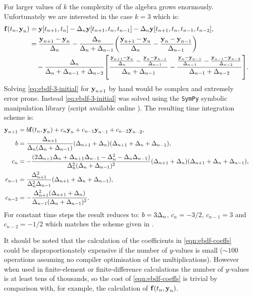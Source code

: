 For larger values of $k$ the complexity of the algebra grows enormously.
Unfortunately we are interested in the case $k=3$ which is:
\begin{equation}
  \begin{aligned}
    {\boldsymbol{\mathrm{f}}}(t_n, \boldsymbol{\mathrm{y}}_n) &= \boldsymbol{\mathrm{y}}[t_{n+1}, t_n] - \Delta_{n} \boldsymbol{\mathrm{y}}[t_{n+1}, t_n, t_{n-1}] -\Delta_{n} \boldsymbol{\mathrm{y}}[t_{n+1}, t_n, t_{n-1}, t_{n-2}], \\
    &=  \frac{\boldsymbol{\mathrm{y}}_{n+1} - \boldsymbol{\mathrm{y}}_n}{\Delta_{n}}
    - \frac{\Delta_{n}}{\Delta_{n} + \Delta_{n-1}} {\left(  \frac{\boldsymbol{\mathrm{y}}_{n+1} - \boldsymbol{\mathrm{y}}_n}{\Delta_{n}} - \frac{\boldsymbol{\mathrm{y}}_n - \boldsymbol{\mathrm{y}}_{n-1}}{\Delta_{n-1}} \right)} \\
    &\quad - \frac{\Delta_{n}}{\Delta_{n} + \Delta_{n-1} + \Delta_{n-2}}
         {\left[ 
           \frac{\frac{\boldsymbol{\mathrm{y}}_{n+1} - \boldsymbol{\mathrm{y}}_n}{\Delta_{n}} - \frac{\boldsymbol{\mathrm{y}}_n - \boldsymbol{\mathrm{y}}_{n-1}}{\Delta_{n-1}}}
                {\Delta_{n} +\Delta_{n-1}}
           -
           \frac{\frac{\boldsymbol{\mathrm{y}}_{n} - \boldsymbol{\mathrm{y}}_{n-1}}{\Delta_{n-1}} - \frac{\boldsymbol{\mathrm{y}}_{n-1} - \boldsymbol{\mathrm{y}}_{n-2}}{\Delta_{n-2}}}
                {\Delta_{n-1} +\Delta_{n-2}}
          \right]}.
  \end{aligned}
  \label{eq:ebdf-3-initial}
\end{equation}
Solving \cref{eq:ebdf-3-initial} for $\boldsymbol{\mathrm{y}}_{n+1}$ by hand would be complex and extremely error prone.
Instead \cref{eq:ebdf-3-initial} was solved using the \texttt{SymPy} symbolic manipulation library \cite{sympy} (script available online \cite{ebdf3-sympy-script}).
The resulting time integration scheme is:
\begin{equation}
  \label{eqn:ebdf-coeffs}
  \begin{aligned}
    \boldsymbol{\mathrm{y}}_{n+1} &= b {\boldsymbol{\mathrm{f}}}(t_n, \boldsymbol{\mathrm{y}}_n) + c_n \boldsymbol{\mathrm{y}}_n + c_{n-1} \boldsymbol{\mathrm{y}}_{n-1} + c_{n-2} \boldsymbol{\mathrm{y}}_{n-2}, \\
    b &= \frac{\Delta_{n+1}}{\Delta_{n} (\Delta_{n} + \Delta_{n-1})} (\Delta_{n+1} + \Delta_{n}) (\Delta_{n+1} + \Delta_{n} + \Delta_{n-1}) ,\\
    c_n &= - \frac{ (2 \Delta_{n+1} \Delta_{n} + \Delta_{n+1} \Delta_{n-1} - \Delta_{n}^{2} - \Delta_{n} \Delta_{n-1}) }{\Delta_{n}^{2} (\Delta_{n} + \Delta_{n-1})^{2}} (\Delta_{n+1} + \Delta_{n}) (\Delta_{n+1} + \Delta_{n} + \Delta_{n-1}),\\
    c_{n-1} &= \frac{\Delta_{n+1}^{2}}{\Delta_{n}^{2} \Delta_{n-1}} (\Delta_{n+1} + \Delta_{n} + \Delta_{n-1}) ,\\
    c_{n-2} &= - \frac{\Delta_{n+1}^{2} (\Delta_{n+1} + \Delta_{n})}{\Delta_{n-1} (\Delta_{n} + \Delta_{n-1})^{2}}.
  \end{aligned}
\end{equation}
For constant time steps the result reduces to: $ b = 3\Delta_{n}$, $c_n = -3/2$, $c_{n-1} = 3$ and  $c_{n-2} = -1/2$ which matches the scheme given in \cite[364]{HairerNorsettWanner}.

It should be noted that the calculation of the coefficients in \cref{eqn:ebdf-coeffs} could be disproportionately expensive if the number of $y$-values is small ($\sim 100$ operations assuming no compiler optimisation of the multiplications).
However when used in finite-element or finite-difference calculations the number of $y$-values is at least tens of thousands, so the cost of \cref{eqn:ebdf-coeffs} is trivial by comparison with, for example, the calculation of ${\boldsymbol{\mathrm{f}}{\left( t_n, \boldsymbol{\mathrm{y}}_n \right)}}$.


